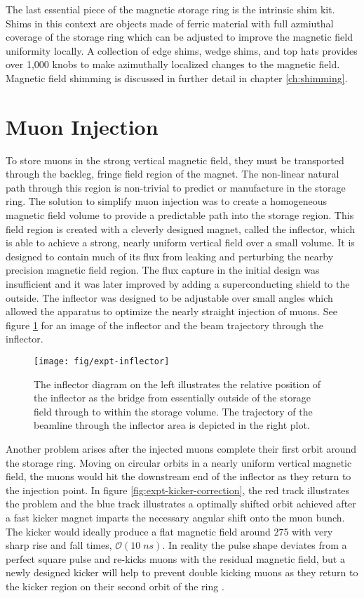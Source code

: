 The last essential piece of the magnetic storage ring is the intrinsic shim kit.  Shims in this context are objects made of ferric material with full azmiuthal coverage of the storage ring which can be adjusted to improve the magnetic field uniformity locally. A collection of edge shims, wedge shims, and top hats provides over 1,000 knobs to make azimuthally localized changes to the magnetic field.
Magnetic field shimming is discussed in further detail in chapter \ref{ch:shimming}.

\section{Muon Injection} \label{sec:muon-injection}
To store muons in the strong vertical magnetic field, they must be transported through the backleg, fringe field region of the magnet.  The non-linear natural path through this region is non-trivial to predict or manufacture in the storage ring.  The solution to simplify muon injection was to create a homogeneous magnetic field volume to provide a predictable path into the storage region. This field region is created with a cleverly designed magnet, called the inflector, which is able to achieve a strong, nearly uniform vertical field over a small volume.  It is designed to contain much of its flux from leaking and perturbing the nearby precision magnetic field region.  The flux capture in the initial design was insufficient and it was later improved by adding a superconducting shield to the outside.  The inflector was designed to be adjustable over small angles which allowed the apparatus to optimize the nearly straight injection of muons. See figure \ref{fig:expt-inflector} for an image of the inflector and the beam trajectory through the inflector. \cite{e989-tdr, e821-prd}

\begin{figure}
\label{fig:expt-inflector}
\texttt{[image: fig/expt-inflector]}
\caption{The inflector diagram on the left illustrates the relative position of the inflector as the bridge from essentially outside of the storage field through to within the storage volume.  The trajectory of the beamline through the inflector area is depicted in the right plot.}
\end{figure}

Another problem arises after the injected muons complete their first orbit around the storage ring.  Moving on circular orbits in a nearly uniform vertical magnetic field, the muons would hit the downstream end of the inflector as they return to the injection point.  In figure \ref{fig:expt-kicker-correction}, the red track illustrates the problem and the blue track illustrates a optimally shifted orbit achieved after a fast kicker magnet imparts the necessary angular shift onto the muon bunch.  The kicker would ideally produce a flat magnetic field around \SI{275}{\gauss} with very sharp rise and fall times, $\mathcal{O}(10\;ns)$. In reality the pulse shape deviates from a perfect square pulse and re-kicks muons with the residual magnetic field, but a newly designed kicker will help to prevent double kicking muons as they return to the kicker region on their second orbit of the ring \cite{e989-tdr}.  

